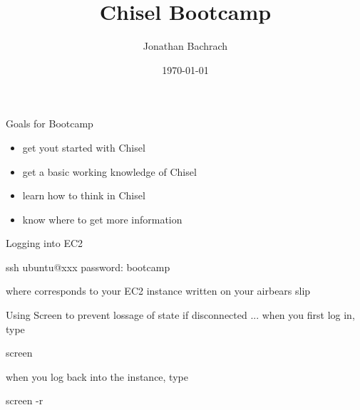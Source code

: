 \documentclass[xcolor=pdflatex,dvipsnames,table]{beamer}
\title{Chisel Bootcamp}
\author{Jonathan Bachrach}
\date{\today}
\institute[UC Berkeley]{EECS UC Berkeley}
\begin{document}
\begin{frame}
\titlepage
\end{frame}
\addtocounter{framenumber}{-1}

% 
% 
% 

\begin{frame}[fragile]{Goals for Bootcamp}

\begin{itemize}
\item get yout started with Chisel
\item get a basic working knowledge of Chisel
\item learn how to think in Chisel
\item know where to get more information
\end{itemize}

\end{frame}

\begin{frame}[fragile]{Logging into EC2}

\begin{scala}
ssh ubuntu@xxx
password: bootcamp
\end{scala}
\noindent
where  corresponds to your EC2 instance written on your airbears slip

\end{frame}

\begin{frame}[fragile]{Using Screen}
to prevent lossage of state if disconnected ... when you first log in, type
\begin{scala}
screen
\end{scala}

when you log back into the instance, type
\begin{scala}
screen -r
\end{scala}

\end{frame}
\end{document}

